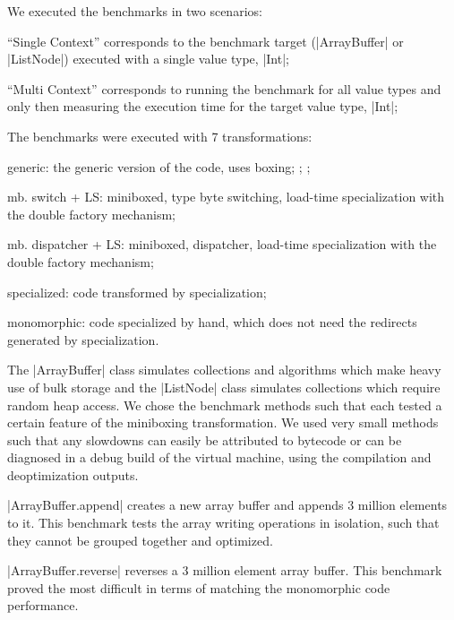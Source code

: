 We executed the benchmarks in two scenarios:
\begin{packed_item}
\item ``Single Context'' corresponds to the benchmark target (|ArrayBuffer| or |ListNode|) executed with a single value type, |Int|;
\item ``Multi Context'' corresponds to running the benchmark for all value types and only then measuring the execution time for the target value type, |Int|;
\end{packed_item}  
\vspace{0mm}
The benchmarks were executed with 7 transformations:
\begin{packed_item}
\item {generic}: the generic version of the code, uses boxing;
;
;
\item {mb. switch + LS}: miniboxed, type byte switching, load-time specialization with the double factory mechanism; 
\item {mb. dispatcher + LS}: miniboxed, dispatcher, load-time specialization with the double factory mechanism;
\item {specialized}: code transformed by specialization;
\item {monomorphic}: code specialized by hand, which does not need the redirects generated by specialization.
\end{packed_item}
\vspace{-1mm}

 The |ArrayBuffer| class simulates collections and algorithms which make heavy use of bulk storage and the |ListNode| class simulates collections which require random heap access. We chose the benchmark methods such that each tested a certain feature of the miniboxing transformation. We used very small methods such that any slowdowns can easily be attributed to bytecode or can be diagnosed in a debug build of the virtual machine, using the compilation and deoptimization outputs. 

|ArrayBuffer.append| creates a new array buffer and appends 3 million elements to it. This benchmark tests the array writing operations in isolation, such that they cannot be grouped together and optimized. 

|ArrayBuffer.reverse| reverses a 3 million element array buffer. This benchmark proved the most difficult in terms of matching the monomorphic code performance.

